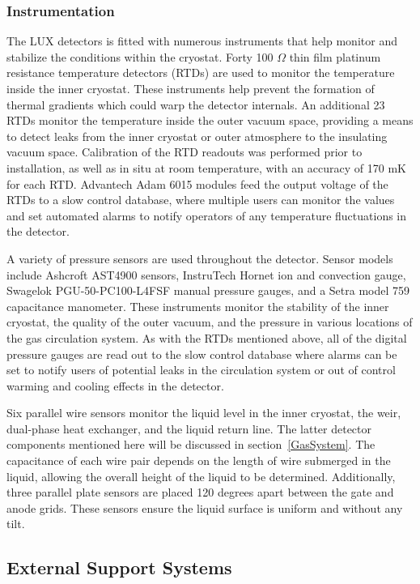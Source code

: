 \subsubsection{Instrumentation}

The LUX detectors is fitted with numerous instruments that help monitor and stabilize the conditions within the cryostat. Forty 100 $\Omega$ thin film platinum resistance temperature detectors (RTDs) are used to monitor the temperature inside the inner cryostat. These instruments help prevent the formation of thermal gradients which could warp the detector internals.  An additional 23 RTDs monitor the temperature inside the outer vacuum space, providing a means to detect leaks from the inner cryostat or outer atmosphere to the insulating vacuum space. Calibration of the RTD readouts was performed prior to installation, as well as in situ at room temperature, with an accuracy of 170 mK for each RTD.  Advantech Adam 6015 modules feed the output voltage of the RTDs to a slow control database, where multiple users can monitor the values and set automated alarms to notify operators of any temperature fluctuations in the detector.  

A variety of pressure sensors are used throughout the detector.  Sensor models include Ashcroft AST4900 sensors, InstruTech Hornet ion and convection gauge, Swagelok PGU-50-PC100-L4FSF manual pressure gauges, and a Setra model 759 capacitance manometer.  These instruments monitor the stability of the inner cryostat, the quality of the outer vacuum, and the pressure in various locations of the gas circulation system.  As with the RTDs mentioned above, all of the digital pressure gauges are read out to the slow control database where alarms can be set to notify users of potential leaks in the circulation system or out of control warming and cooling effects in the detector.

Six parallel wire sensors monitor the liquid level in the inner cryostat, the weir, dual-phase heat exchanger, and the liquid return line.   The latter detector components mentioned here will be discussed in section~\ref{GasSystem}.  The capacitance of each wire pair depends on the length of wire submerged in the liquid, allowing the overall height of the liquid to be determined.  Additionally, three parallel plate sensors are placed 120 degrees apart between the gate and anode grids.  These sensors ensure the liquid surface is uniform and without any tilt.    


\subsection{External Support Systems}

